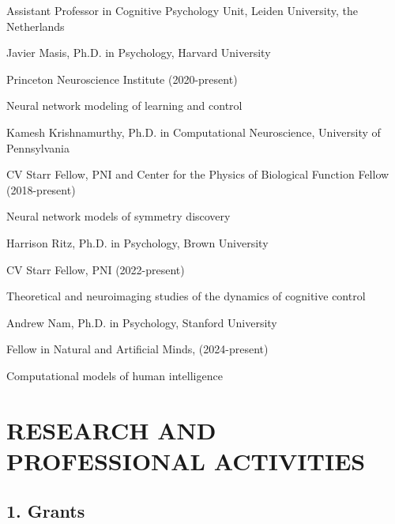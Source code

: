 \documentclass[10 pt]{article}
\begin{document}
Assistant Professor in Cognitive Psychology Unit, Leiden University, the Netherlands
    \medskip


Javier Masis, Ph.D. in Psychology, Harvard University

Princeton Neuroscience Institute (2020-present)


Neural network modeling of learning and control
    \medskip

Kamesh Krishnamurthy, Ph.D. in Computational Neuroscience, University of Pennsylvania

CV Starr Fellow, PNI and Center for the Physics of Biological Function Fellow (2018-present)

Neural network models of symmetry discovery
    \medskip

Harrison Ritz, Ph.D. in Psychology, Brown University

CV Starr Fellow, PNI (2022-present)

Theoretical and neuroimaging studies of the dynamics of cognitive control
    \medskip

Andrew Nam, Ph.D. in Psychology, Stanford University

Fellow in Natural and Artificial Minds, (2024-present)

Computational models of human intelligence
    \medskip


\section*{RESEARCH AND PROFESSIONAL ACTIVITIES} \label{secRAPA}

\subsection*{1. Grants} \label{secRAPA1}
\end{document}
